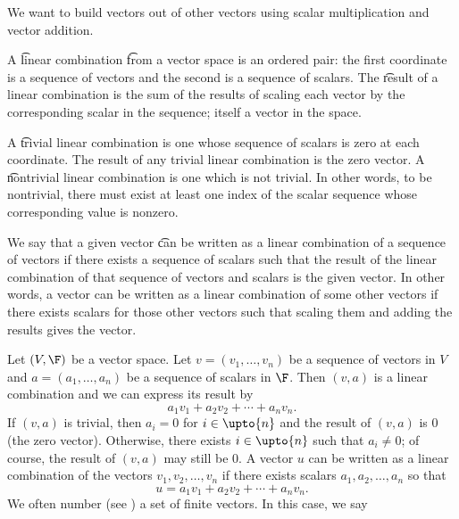 

We want to build vectors out of other vectors using scalar multiplication and vector addition.


A \t{linear combination} \t{from} a vector space is an ordered pair: the first coordinate is a sequence of vectors and the second is a sequence of scalars.
The \t{result} of a linear combination is the sum of the results of scaling each vector by the corresponding scalar in the sequence; itself a vector in the space.

A \t{trivial linear combination} is one whose sequence of scalars is zero at each coordinate.
The result of any trivial linear combination is the zero vector.
A \t{nontrivial linear combination} is one which is not trivial.
In other words, to be nontrivial, there must exist at least one index of the scalar sequence whose corresponding value is nonzero.

We say that a given vector \t{can be written as a linear combination of} a sequence of vectors if there exists a sequence of scalars such that the result of the linear combination of that sequence of vectors and scalars is the given vector.
In other words, a vector can be written as a linear combination of some other vectors if there exists scalars for those other vectors such that scaling them and adding the results gives the vector.


Let $(V, \F)$ be a vector space.
Let $v = (v_1, \dots, v_n)$ be a sequence of vectors in $V$ and
$a = (a_1, \dots, a_n)$ be a sequence of scalars in $\F$.
Then $(v, a)$ is a linear combination and we can express its result by
  \[
a_1v_1 + a_2v_2 + \cdots + a_n v_n.
  \]
If $(v,a)$ is trivial, then $a_i = 0$ for $i \in \upto{n}$ and the result of $(v, a)$ is $0$ (the zero vector).
Otherwise, there exists $i \in \upto{n}$ such that $a_i \neq 0$; of course, the result of $(v, a)$ may still be $0$.
A vector $u$ can be written as a linear combination of the vectors $v_1, v_2, \dots, v_n$ if there exists scalars $a_1, a_2, \dots, a_n$ so that
    \[
u = a_1v_1 + a_2v_2 + \cdots + a_nv_n.
    \]
We often number (see ) a set of finite vectors.
In this case, we say 

